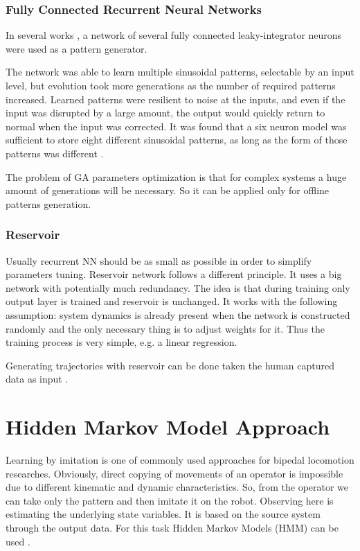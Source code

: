 \documentclass[12pt,a4paper]{report}
\begin{document}
				\subsubsection{Fully Connected Recurrent Neural Networks}
					In several works \cite{reil2002evolution}, \cite{petridis1994recurrent} a network of several fully connected leaky-integrator neurons were used as a pattern generator. 
					
					The network was able to learn multiple sinusoidal patterns, selectable by an input level, but evolution took more generations as the number of required patterns increased. Learned patterns were resilient to noise at the inputs, and even if the input was disrupted by a large amount, the output would quickly return to normal when the input was corrected. It was found that a six neuron model was sufficient to store eight different sinusoidal patterns, as long as the form of those patterns was different \cite{wright2014intelligent}.
					
					The problem of GA parameters optimization is that for complex systems a huge amount of generations will be necessary. So it can be applied only for offline patterns generation. 
				\subsubsection{Reservoir}
					Usually recurrent NN should be as small as possible in order to simplify parameters tuning. Reservoir network follows a different principle. It uses a big network with potentially much redundancy. The idea is that during training only output layer is trained and reservoir is unchanged. It works with the following assumption: system dynamics is already present when the network is constructed randomly and the only necessary thing is to adjust weights for it. Thus the training process is very simple, e.g. a linear regression.
					
					Generating trajectories with reservoir can be done taken the human captured data as input \cite{wyffels2009design}.
		\section{Hidden Markov Model Approach}
			Learning by imitation is one of commonly used approaches for bipedal locomotion researches. Obviously, direct copying of movements of an operator is impossible due to different kinematic and dynamic characteristics. So, from the operator we can take only the pattern and then imitate it on the robot. Observing here is estimating the underlying state variables. It is based on the source system through the output data. For this task Hidden Markov Models (HMM) can be used \cite{inamura2004embodied}. 
			
\end{document}

